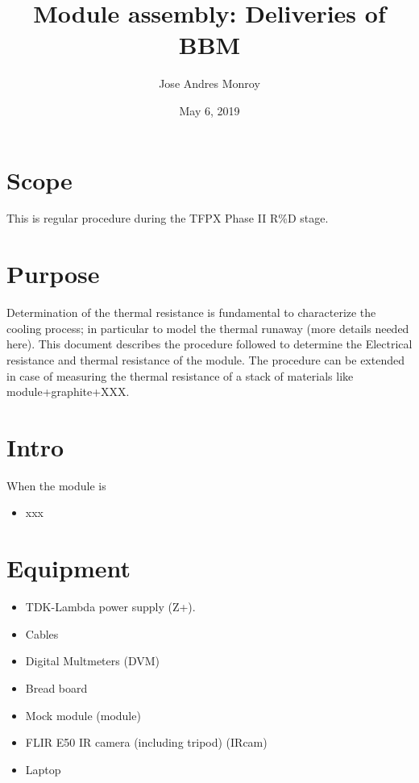 \documentclass[12pt]{unlsilabsop}
\title{Module assembly: Deliveries of BBM}
\date{May 6, 2019}
\author{Jose Andres Monroy}
\begin{document}
\maketitle

\section{Scope}
This is regular procedure during the TFPX Phase II R\%D stage.

\section{Purpose}
Determination of the thermal resistance is fundamental to characterize the cooling process; in particular to model the thermal runaway (more details needed here). This document describes the procedure followed to determine the Electrical resistance and thermal resistance of the module. The procedure can be extended in case of measuring the thermal resistance of a stack of materials like module+graphite+XXX.


\section{Intro}
When the module is  
\begin{itemize}
    \item xxx
\end{itemize}

\section{Equipment}

\begin{itemize}
    \item TDK-Lambda power supply (Z+).  
    \item Cables
    \item Digital Multmeters (DVM)
    \item Bread board
    \item Mock module (module)
    \item FLIR E50 IR camera (including tripod) (IRcam)
    \item Laptop
\end{itemize}
\end{document}
